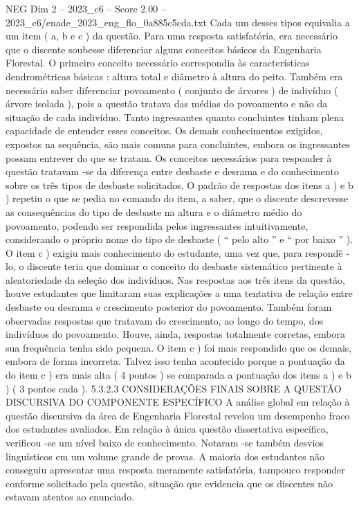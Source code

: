 \begin{textsample}{NEG Dim 2 – 2023\_c6 – Score 2.00 – 2023\_c6/enade\_2023\_eng\_flo\_0a885c5cda.txt}
Cada um desses tipos equivalia a um item ( a, b e c ) da questão.
Para uma resposta satisfatória, era necessário que o discente soubesse diferenciar alguns conceitos básicos da Engenharia Florestal.
O primeiro conceito necessário correspondia às características dendrométricas básicas : altura total e diâmetro à altura do peito.
Também era necessário saber diferenciar povoamento ( conjunto de árvores ) de indivíduo ( árvore isolada ), pois a questão tratava das médias do povoamento e não da situação de cada indivíduo.
Tanto ingressantes quanto concluintes tinham plena capacidade de entender esses conceitos.
Os demais conhecimentos exigidos, expostos na sequência, são mais comuns para concluintes, embora os ingressantes possam entrever do que se tratam.
Os conceitos necessários para responder à questão tratavam -se da diferença entre desbaste e desrama e do conhecimento sobre os três tipos de desbaste solicitados.
O padrão de respostas dos itens a ) e b ) repetiu o que se pedia no comando do item, a saber, que o discente descrevesse as consequências do tipo de desbaste na altura e o diâmetro médio do povoamento, podendo ser respondida pelos ingressantes intuitivamente, considerando o próprio nome do tipo de desbaste ( “ pelo alto ” e “ por baixo ” ).
O item c ) exigiu mais conhecimento do estudante, uma vez que, para respondê -lo, o discente teria que dominar o conceito do desbaste sistemático pertinente à aleatoriedade da seleção dos indivíduos.
Nas respostas aos três itens da questão, houve estudantes que limitaram suas explicações a uma tentativa de relação entre desbaste ou desrama e crescimento posterior do povoamento.
Também foram observadas respostas que tratavam do crescimento, ao longo do tempo, dos indivíduos do povoamento.
Houve, ainda, respostas totalmente corretas, embora sua frequência tenha sido pequena.
O item c ) foi mais respondido que os demais, embora de forma incorreta.
Talvez isso tenha acontecido porque a pontuação da do item c ) era mais alta ( 4 pontos ) se comparada a pontuação dos itens a ) e b ) ( 3 pontos cada ). 5.3.2.3 CONSIDERAÇÕES FINAIS SOBRE A QUESTÃO DISCURSIVA DO COMPONENTE ESPECÍFICO A análise global em relação à questão discursiva da área de Engenharia Florestal revelou um desempenho fraco dos estudantes avaliados.
Em relação à única questão dissertativa específica, verificou -se um nível baixo de conhecimento.
Notaram -se também desvios linguísticos em um volume grande de provas.
A maioria dos estudantes não conseguiu apresentar uma resposta meramente satisfatória, tampouco responder conforme solicitado pela questão, situação que evidencia que os discentes não estavam atentos ao enunciado.

\end{textsample}
